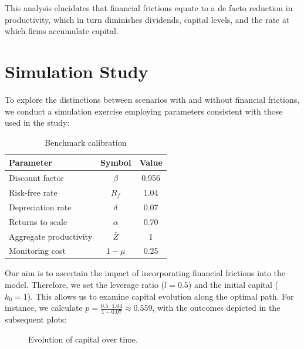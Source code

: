 \documentclass[12pt]{article}
\begin{document}
This analysis elucidates that financial frictions equate to a de facto reduction in productivity, which in turn
diminishes dividends, capital levels, and the rate at which firms accumulate capital. 

\section{Simulation Study}

To explore the distinctions between scenarios with and without financial frictions, we conduct a simulation exercise
employing  parameters consistent with those used in the \cite{OsePap17} study:

\begin{table}[H]
    \centering
    \begin{tabular}{lcc}
    \hline Parameter & Symbol & Value \\
    \hline \hline
    Discount factor & $\beta$ & 0.956 \\
    Risk-free rate & $R_f$ & 1.04 \\
    Depreciation rate & $\delta$ & 0.07 \\
    Returns to scale & $\alpha$ & 0.70 \\
    Aggregate productivity & $\bar{Z}$ & 1 \\
    Monitoring cost & $1-\mu$ & 0.25 \\
    \hline
    \end{tabular}
    \caption{Benchmark calibration}
\end{table}

Our aim is to ascertain the impact of incorporating financial frictions into the model. Therefore, we set the leverage
ratio (\(l=0.5\))  and the initial capital (\(k_0=1\)). This allows us to examine capital evolution along the optimal
path. For instance, we calculate \(p=\frac{0.5 \cdot 1.04}{1-0.07} \approx 0.559\), with the outcomes depicted in the
subsequent plots:

\begin{figure}[H]
    \centering
    \caption{Evolution of capital over time.}
    \label{fig:capitalEvolution}
\end{figure}
\end{document}

